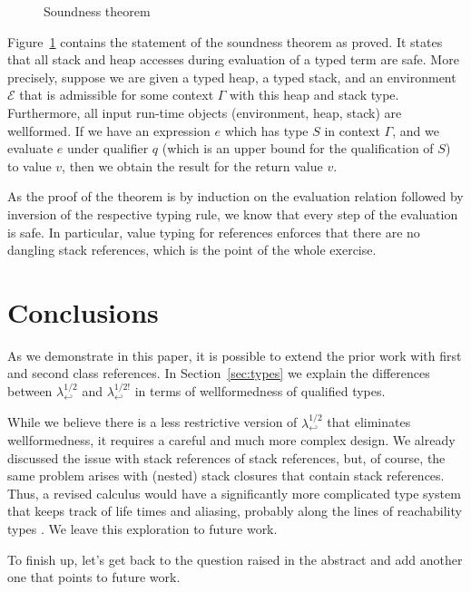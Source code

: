 \documentclass[sigplan,review,dvipsnames,screen,10pt]{acmart}
\newcommand{\LamWhatif}{\ensuremath{\lambda^{1/2}_{\hookleftarrow}}}
\newcommand{\LamOurs}{\ensuremath{\lambda^{1/2!}_{\hookleftarrow}}}
\begin{document}
\begin{figure}[tp]
  \EvalSoundness  
  \caption{Soundness theorem}
  \label{fig:soundness-theorem}
\end{figure}
Figure~\ref{fig:soundness-theorem} contains the statement of the
soundness theorem as proved. 
It states that all stack and heap accesses during evaluation of a
typed term are safe.
More precisely, suppose we are given a typed heap, a typed stack, and
an environment $\mathcal{E}$ that is admissible for some context
$\Gamma$ with this heap and stack type. Furthermore, all input
run-time objects (environment, heap, stack) are wellformed.
If we have an expression $e$ which has  type $S$ in context $\Gamma$,
and we evaluate $e$ under qualifier $q$ (which is an upper bound for
the qualification of $S$) to value $v$, then we obtain the result for the return
value $v$.

As the proof of the theorem is by induction on the evaluation relation
followed by inversion of the respective typing rule, we know that
every step of the evaluation is safe. In particular, value typing for
references enforces that there are no dangling stack references, which
is the point of the whole exercise.

\section{Conclusions}
\label{sec:conclusions}

As we demonstrate in this paper, it is possible to extend the prior
work \cite{DBLP:conf/ecoop/XhebrajB0R22} with first and second class
references. In Section~\ref{sec:types} we explain the differences
between $\LamWhatif$ and $\LamOurs$ in terms of wellformedness of
qualified types.

While we believe there is a less restrictive version of $\LamWhatif$
that eliminates wellformedness, it requires a careful and much more
complex design. We 
already discussed the issue with stack references of stack references,
but, of course, the same problem arises with (nested) stack closures
that contain stack references. Thus, a revised calculus would have a
significantly more complicated type system that keeps track of life
times and aliasing, probably along the lines of reachability types
\cite{DBLP:journals/pacmpl/BaoWBJHR21}. We leave this
exploration to future work.


To finish up, let's get back to the question raised in the abstract and
add another one that points to future work.
\end{document}
